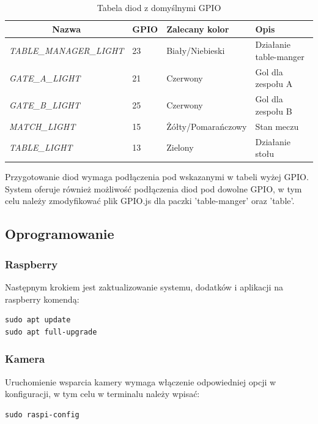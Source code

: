 \begin{table}[h!]
\centering
\begin{tabular}{|l|l|l|l|}
\hline
\multicolumn{1}{|c|}{\textbf{Nazwa}} & \multicolumn{1}{c|}{\textbf{GPIO}} & \textbf{Zalecany kolor} & \textbf{Opis} \\ \hline
\textit{TABLE\_MANAGER\_LIGHT} & 23 & Biały/Niebieski & Działanie table-manger \\ \hline
\textit{GATE\_A\_LIGHT} & 21 & Czerwony & Gol dla zespołu A \\ \hline
\textit{GATE\_B\_LIGHT} & 25 & Czerwony & Gol dla zespołu B \\ \hline
\textit{MATCH\_LIGHT} & 15 & Żółty/Pomarańczowy & Stan meczu \\ \hline
\textit{TABLE\_LIGHT} & 13 & Zielony & Działanie stołu \\ \hline
\end{tabular}
\caption{Tabela diod z domyślnymi GPIO}
\end{table}

Przygotowanie diod wymaga podłączenia pod wskazanymi w tabeli wyżej GPIO. System oferuje również możliwość podłączenia diod pod dowolne GPIO,  w tym celu należy zmodyfikować plik GPIO.js dla paczki 'table-manger' oraz 'table'.

\subsection{Oprogramowanie}

\subsubsection{Raspberry}

Następnym krokiem jest zaktualizowanie systemu, dodatków i aplikacji na raspberry komendą:

\begin{lstlisting}
sudo apt update
sudo apt full-upgrade
\end{lstlisting}

\subsubsection{Kamera}

Uruchomienie wsparcia kamery wymaga włączenie odpowiedniej opcji w konfiguracji, w tym celu w terminalu należy wpisać:

\begin{lstlisting}
sudo raspi-config
\end{lstlisting}

